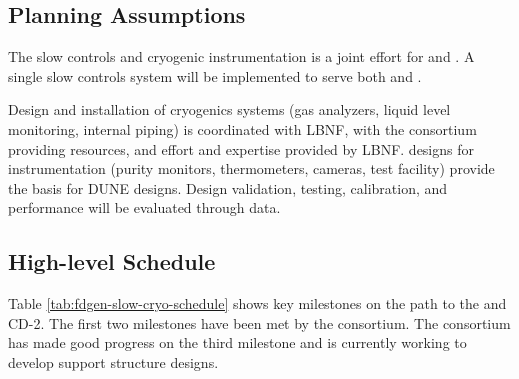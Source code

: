 \subsection{Planning Assumptions}
\label{sec:fdgen-slow-cryo-org-assmp}

The slow controls and cryogenic instrumentation is a joint effort for \single and \dual{}.
A single slow controls system will be implemented to serve both \single and \dual{}.

Design and installation of cryogenics systems (gas analyzers, liquid level monitoring, internal piping) is coordinated with LBNF, with the consortium providing resources, and effort and expertise provided by LBNF.
 designs for \lar instrumentation (purity monitors, thermometers, cameras, test facility) provide the basis for DUNE designs. Design validation, testing, calibration, and performance will be evaluated through  data.



\subsection{High-level Schedule}
\label{sec:fdgen-slow-cryo-org-cs}

Table \ref{tab:fdgen-slow-cryo-schedule} shows key milestones on
the path to the  and CD-2.  The first two milestones have been met by the consortium.
The consortium has made good progress on the third milestone and is currently working to develop support structure designs.

